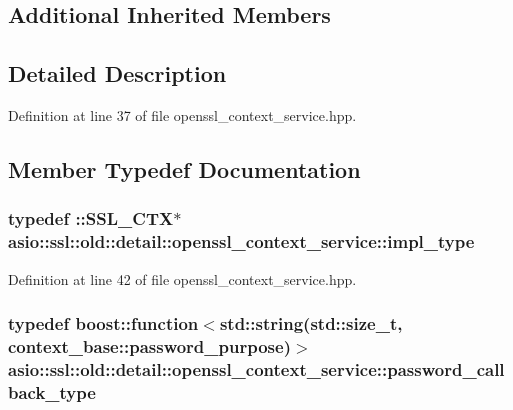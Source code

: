 \subsection*{Additional Inherited Members}


\subsection{Detailed Description}


Definition at line 37 of file openssl\+\_\+context\+\_\+service.\+hpp.



\subsection{Member Typedef Documentation}
\hypertarget{classasio_1_1ssl_1_1old_1_1detail_1_1openssl__context__service_a1287914e0f48a9098c9141ca33ecd570}{}
\subsubsection[{impl\+\_\+type}]{\setlength{\rightskip}{0pt plus 5cm}typedef \+::S\+S\+L\+\_\+\+C\+T\+X$\ast$ {\bf asio\+::ssl\+::old\+::detail\+::openssl\+\_\+context\+\_\+service\+::impl\+\_\+type}}\label{classasio_1_1ssl_1_1old_1_1detail_1_1openssl__context__service_a1287914e0f48a9098c9141ca33ecd570}


Definition at line 42 of file openssl\+\_\+context\+\_\+service.\+hpp.

\hypertarget{classasio_1_1ssl_1_1old_1_1detail_1_1openssl__context__service_aca3250c5d335efd54d1b3b7a49ed22a8}{}
\subsubsection[{password\+\_\+callback\+\_\+type}]{\setlength{\rightskip}{0pt plus 5cm}typedef boost\+::function$<$std\+::string(std\+::size\+\_\+t, {\bf context\+\_\+base\+::password\+\_\+purpose})$>$ {\bf asio\+::ssl\+::old\+::detail\+::openssl\+\_\+context\+\_\+service\+::password\+\_\+callback\+\_\+type}}\label{classasio_1_1ssl_1_1old_1_1detail_1_1openssl__context__service_aca3250c5d335efd54d1b3b7a49ed22a8}


